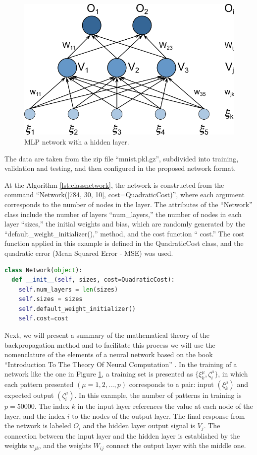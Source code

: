 \begin{figure}
    \centering
    \includegraphics[scale=0.55]{images/figure111.png}
    \caption{MLP network with a hidden layer.}
    \label{fig:figure111}
\end{figure}

The data are taken from the zip file “mnist.pkl.gz”, subdivided into training, validation and testing, and then configured in the proposed network format.

At the Algorithm \ref{lst:classnetwork}, the network is constructed from the command “Network([784, 30, 10], cost=QuadraticCost)”, where each argument corresponds to the number of nodes in the layer. The attributes of the “Network” class include the number of layers “num\_layers,” the number of nodes in each layer “sizes,” the initial weights and bias, which are randomly generated by the “default\_weight\_initializer(),” method, and the cost function “ cost.” The cost function applied in this example is defined in the QuadraticCost class, and the quadratic error (Mean Squared Error - MSE) was used.

\begin{lstlisting}[caption={Delta method in Python},label={lst:classnetwork},language=Python]
class Network(object):
  def __init__(self, sizes, cost=QuadraticCost):
    self.num_layers = len(sizes)
    self.sizes = sizes
    self.default_weight_initializer()
    self.cost=cost
\end{lstlisting}

Next, we will present a summary of the mathematical theory of the backpropagation method and to facilitate this process we will use the nomenclature of the elements of a neural network based on the book “Introduction To The Theory Of Neural Computation” \cite{hertz2018}. In the training of a network like the one in Figure \ref{fig:figure111}, a training set is presented as $\{\xi_k^\mu,\zeta_i^\mu\}$, in which each pattern presented $(\mu=1,2,\dots,p)$ corresponds to a pair: input $(\xi_k^\mu)$ and expected output $(\zeta_i^\mu)$. In this example, the number of patterns in training is $p=50000$. The index $k$ in the input layer references the value at each node of the layer, and the index $i$ to the nodes of the output layer. The final response from the network is labeled $O_i$ and the hidden layer output signal is $V_j$. The connection between the input layer and the hidden layer is established by the weights $w_{jk}$, and the weights $W_{ij}$ connect the output layer with the middle one.

